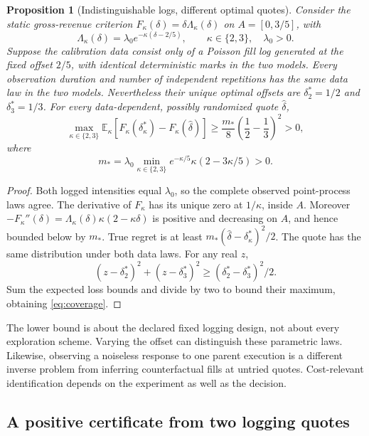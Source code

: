 \documentclass[11pt]{article}
\theoremstyle{plain}
\newtheorem{proposition}[theorem]{Proposition}
\theoremstyle{definition}
\theoremstyle{remark}
\newcommand{\E}{\mathbb E}
\begin{document}
\begin{proposition}[Indistinguishable logs, different optimal quotes]
\label{prop:coverage}
Consider the static gross-revenue criterion \(F_\kappa(\delta)
=\delta\Lambda_\kappa(\delta)\) on \(A=[0,3/5]\), with
\[
\Lambda_\kappa(\delta)=
\lambda_0e^{-\kappa(\delta-2/5)},\qquad
\kappa\in\{2,3\},\quad\lambda_0>0.
\]
Suppose the calibration data consist only of a Poisson fill log
generated at the fixed offset \(2/5\), with identical deterministic
marks in the two models. Every observation duration and number of
independent repetitions has the same data law in the two models.
Nevertheless their unique optimal offsets are
\(\delta_2^\ast=1/2\) and \(\delta_3^\ast=1/3\).
For every data-dependent, possibly randomized quote \(\widehat\delta\),
\begin{equation}\label{eq:coverage}
\max_{\kappa\in\{2,3\}}
\E_\kappa[F_\kappa(\delta_\kappa^\ast)-F_\kappa(\widehat\delta)]
\ge\frac{m_\ast}{8}\left(\frac12-\frac13\right)^2>0,
\end{equation}
where
\[
m_\ast=\lambda_0\min_{\kappa\in\{2,3\}}
e^{-\kappa/5}\kappa(2-3\kappa/5)>0.
\]
\end{proposition}
\begin{proof}
Both logged intensities equal \(\lambda_0\), so the complete observed
point-process laws agree. The derivative of \(F_\kappa\) has its
unique zero at \(1/\kappa\), inside \(A\).
Moreover
\(-F_\kappa''(\delta)=
\Lambda_\kappa(\delta)\kappa(2-\kappa\delta)\)
is positive and decreasing on \(A\), and hence bounded below by
\(m_\ast\). True regret is at least
\(m_\ast(\widehat\delta-\delta_\kappa^\ast)^2/2\).
The quote has the same distribution under both data laws.
For any real \(z\),
\[
(z-\delta_2^\ast)^2+(z-\delta_3^\ast)^2
\ge(\delta_2^\ast-\delta_3^\ast)^2/2.
\]
Sum the expected loss bounds and divide by two to bound their
maximum, obtaining \eqref{eq:coverage}.
\end{proof}

The lower bound is about the declared fixed logging design, not
about every exploration scheme. Varying the offset can distinguish
these parametric laws. Likewise, observing a noiseless response to
one parent execution is a different inverse problem from inferring
counterfactual fills at untried quotes. Cost-relevant identification
depends on the experiment as well as the decision.

\subsection{A positive certificate from two logging quotes}
\end{document}
